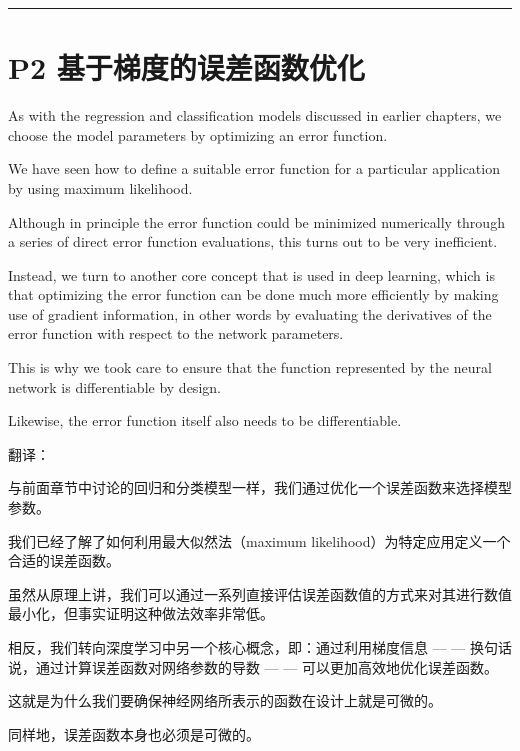 \documentclass{article}
\begin{document}
\noindent\rule{\linewidth}{0.4pt}

\section{P2 基于梯度的误差函数优化}

As with the regression and classification models discussed in earlier chapters, we choose the model parameters by optimizing an error function. 

We have seen how to define a suitable error function for a particular application by using maximum likelihood. 

Although in principle the error function could be minimized numerically through a series of direct error function evaluations, this turns out to be very inefficient. 

Instead, we turn to another core concept that is used in deep learning, which is that optimizing the error function can be done much more efficiently by making use of gradient information, in other words by evaluating the derivatives of the error function with respect to the network parameters. 

This is why we took care to ensure that the function represented by the neural network is differentiable by design. 

Likewise, the error function itself also needs to be differentiable.

{\color{red}
翻译：

与前面章节中讨论的回归和分类模型一样，我们通过优化一个误差函数来选择模型参数。

我们已经了解了如何利用最大似然法（maximum likelihood）为特定应用定义一个合适的误差函数。

虽然从原理上讲，我们可以通过一系列直接评估误差函数值的方式来对其进行数值最小化，但事实证明这种做法效率非常低。

相反，我们转向深度学习中另一个核心概念，即：通过利用梯度信息 — — 换句话说，通过计算误差函数对网络参数的导数 — — 可以更加高效地优化误差函数。

这就是为什么我们要确保神经网络所表示的函数在设计上就是可微的。

同样地，误差函数本身也必须是可微的。
}
\end{document}
